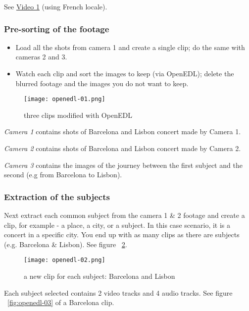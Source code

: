 See \href{https://youtu.be/0li5DdeQ6_o}{Video 1} (using French locale).


\subsubsection*{Pre-sorting of the footage}
\label{ssub:pre_sorting_footage}

	\begin{itemize}
		\item Load all the shots from camera 1 and create a single clip; do the same with cameras 2 and 3.
		\item Watch each clip and sort the images to keep (via OpenEDL); delete the blurred footage and the images you do not want to keep.
	\end{itemize}

\begin{figure}[htpb]
	\centering
	\texttt{[image: openedl-01.png]}
	\caption{three clips modified with OpenEDL}
	\label{fig:openedl-01}
\end{figure}

\textit{Camera 1} contains shots of Barcelona and Lisbon concert made by Camera 1.

\textit{Camera 2} contains shots of Barcelona and Lisbon concert made by Camera 2.

\textit{Camera 3} contains the images of the journey between the first subject and the second (e.g from Barcelona to Lisbon).

\subsubsection*{Extraction of the subjects}
\label{ssub:extraction_subjects}

Next extract each common subject from the camera 1 \& 2 footage and create a clip, for example - a place, a city, or a subject. In this case scenario, it is a concert in a specific city.
You end up with as many clips as there are subjects (e.g. Barcelona \& Lisbon).
 See figure ~\ref{fig:openedl-02}.

\begin{figure}[htpb]
	\centering
	\texttt{[image: openedl-02.png]}
	\caption{a new clip for each subject: Barcelona and Lisbon}
	\label{fig:openedl-02}
\end{figure}

Each subject selected contains 2 video tracks and 4 audio tracks. See figure ~\ref{fig:openedl-03} of a Barcelona clip.

